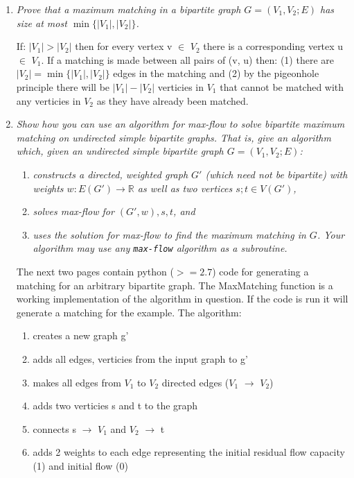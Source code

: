 \documentclass[12pt]{article} \setlength{\oddsidemargin}{0in}
\begin{document}
\begin{enumerate}
\item\textit{Prove that a maximum matching in a bipartite graph $G = (V_1, V_2; E)$ has size at most $\min\{|V_1|,|V_2|\}$.}

If: $|V_1| > |V_2|$ then for every vertex v $\in$ $V_2$ there is a corresponding vertex u $\in$ $V_1$. If a matching is made between all pairs of (v, u) then: (1) there are $|V_2| = \min\{|V_1|,|V_2|\}$ edges in the matching and (2) by the pigeonhole principle there will be $|V_1| - |V_2|$ verticies in $V_1$ that cannot be matched with any verticies in $V_2$ as they have already been matched. 

\item\textit{Show how you can use an algorithm for max-flow to solve bipartite maximum
matching on undirected simple bipartite graphs. That is, give an algorithm which, given an undirected simple bipartite graph $G = (V_1, V_2; E)$:}
\begin{enumerate}[label = (\arabic*)]
\item\textit{constructs a directed, weighted graph $G'$ (which need not be bipartite) with weights $w : E(G') \rightarrow \mathbb{R}$ as well as two vertices $s; t \in V(G')$,}
\item\textit{solves max-flow for $(G',w), s, t$, and}
\item\textit{uses the solution for max-flow to find the maximum matching in $G$. Your algorithm may use any \texttt{max-flow} algorithm as a subroutine.}
\end{enumerate}
\pagebreak
The next two pages contain python ($>= 2.7$) code for generating a matching for an arbitrary bipartite graph. The MaxMatching function is a working implementation of the algorithm in question. If the code is run it will generate a matching for the example.
The algorithm:\\
\begin{enumerate}
\item creates a new graph g'
\item adds all edges, verticies from the input graph to g'
\item makes all edges from $V_1$ to $V_2$ directed edges ($V_1$ $\rightarrow$ $V_2$)
\item adds two verticies s and t to the graph
\item connects s $\rightarrow$ {$V_1$} and {$V_2$} $\rightarrow$ t
\item adds 2 weights to each edge representing the initial residual flow capacity (1) and initial flow (0)

\end{enumerate}
\end{enumerate}
\end{document}
